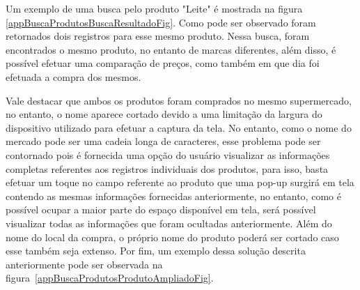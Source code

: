 Um exemplo de uma busca pelo produto "Leite" é mostrada na figura \ref{appBuscaProdutosBuscaResultadoFig}. Como pode ser observado foram retornados dois registros para esse mesmo produto. Nessa busca, foram encontrados o mesmo produto, no entanto de marcas diferentes, além disso, é possível efetuar uma comparação de preços, como também em que dia foi efetuada a compra dos mesmos.

Vale destacar que ambos os produtos foram comprados no mesmo supermercado, no entanto, o nome aparece cortado devido a uma limitação da largura do dispositivo utilizado para efetuar a captura da tela. No entanto, como o nome do mercado pode ser uma cadeia longa de caracteres, esse problema pode ser contornado pois é fornecida uma opção do usuário visualizar as informações completas referentes aos registros individuais dos produtos, para isso, basta efetuar um toque no campo referente ao produto que uma pop-up surgirá em tela contendo as mesmas informações fornecidas anteriormente, no entanto, 
como é possível ocupar a maior parte do espaço disponível em tela, será possível visualizar todas as informações que foram ocultadas anteriormente. Além do nome do local da compra, o próprio nome do produto poderá ser cortado caso esse também seja extenso. Por fim, um exemplo dessa solução descrita anteriormente pode ser observada na figura~\ref{appBuscaProdutosProdutoAmpliadoFig}.

